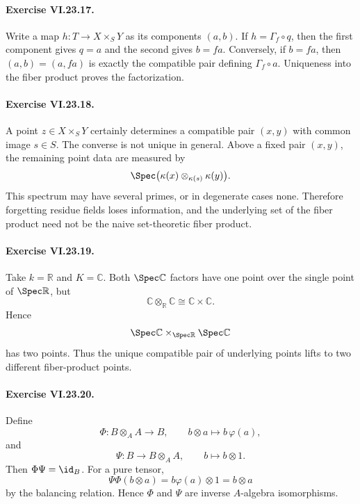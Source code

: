 \paragraph{Exercise VI.23.17.}
\begin{solution}
Write a map $h:T\to X\times_SY$ as its components $(a,b)$.  If
$h=\Gamma_f\circ q$, then the first component gives $q=a$ and the second gives $b=f a$.
Conversely, if $b=f a$, then $(a,b)=(a,f a)$ is exactly the compatible pair defining
$\Gamma_f\circ a$.  Uniqueness into the fiber product proves the factorization.
\end{solution}

\paragraph{Exercise VI.23.18.}
\begin{solution}
A point $z\in X\times_SY$ certainly determines a compatible pair
$(x,y)$ with common image $s\in S$.  The converse is not unique in general.  Above a fixed pair
$(x,y)$, the remaining point data are measured by
\[
\Spec\bigl(\kappa(x)\otimes_{\kappa(s)}\kappa(y)\bigr).
\]
This spectrum may have several primes, or in degenerate cases none.  Therefore forgetting residue
fields loses information, and the underlying set of the fiber product need not be the naive
set-theoretic fiber product.
\end{solution}

\paragraph{Exercise VI.23.19.}
\begin{solution}
Take $k=\mathbb R$ and $K=\mathbb C$.  Both $\Spec\mathbb C$ factors have one point over the
single point of $\Spec\mathbb R$, but
\[
\mathbb C\otimes_{\mathbb R}\mathbb C\cong\mathbb C\times\mathbb C.
\]
Hence
\[
\Spec\mathbb C\times_{\Spec\mathbb R}\Spec\mathbb C
\]
has two points.  Thus the unique compatible pair of underlying points lifts to two different
fiber-product points.
\end{solution}

\paragraph{Exercise VI.23.20.}
\begin{solution}
Define
\[
\Phi:B\otimes_AA\to B,\qquad b\otimes a\mapsto b\,\varphi(a),
\]
and
\[
\Psi:B\to B\otimes_AA,\qquad b\mapsto b\otimes1.
\]
Then $\Phi\Psi=\id_B$.  For a pure tensor,
\[
\Psi\Phi(b\otimes a)=b\varphi(a)\otimes1=b\otimes a
\]
by the balancing relation.  Hence $\Phi$ and $\Psi$ are inverse $A$-algebra isomorphisms.
\end{solution}

